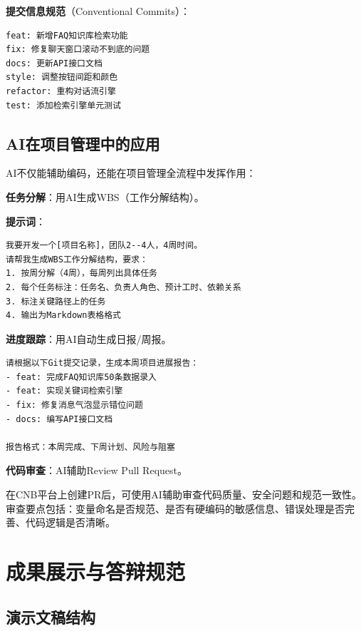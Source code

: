 \textbf{提交信息规范}（Conventional Commits）：

\begin{lstlisting}
feat: 新增FAQ知识库检索功能
fix: 修复聊天窗口滚动不到底的问题
docs: 更新API接口文档
style: 调整按钮间距和颜色
refactor: 重构对话流引擎
test: 添加检索引擎单元测试
\end{lstlisting}

\subsection{AI在项目管理中的应用}

AI不仅能辅助编码，还能在项目管理全流程中发挥作用：

\textbf{任务分解}：用AI生成WBS（工作分解结构）。

\begin{practicebox}[用AI生成项目WBS]
\textbf{提示词}：

\begin{lstlisting}
我要开发一个[项目名称]，团队2--4人，4周时间。
请帮我生成WBS工作分解结构，要求：
1. 按周分解（4周），每周列出具体任务
2. 每个任务标注：任务名、负责人角色、预计工时、依赖关系
3. 标注关键路径上的任务
4. 输出为Markdown表格格式
\end{lstlisting}
\end{practicebox}

\textbf{进度跟踪}：用AI自动生成日报/周报。

\begin{lstlisting}
请根据以下Git提交记录，生成本周项目进展报告：
- feat: 完成FAQ知识库50条数据录入
- feat: 实现关键词检索引擎
- fix: 修复消息气泡显示错位问题
- docs: 编写API接口文档

报告格式：本周完成、下周计划、风险与阻塞
\end{lstlisting}

\textbf{代码审查}：AI辅助Review Pull Request。

在CNB平台上创建PR后，可使用AI辅助审查代码质量、安全问题和规范一致性。审查要点包括：变量命名是否规范、是否有硬编码的敏感信息、错误处理是否完善、代码逻辑是否清晰。

\section{成果展示与答辩规范}

\subsection{演示文稿结构}

